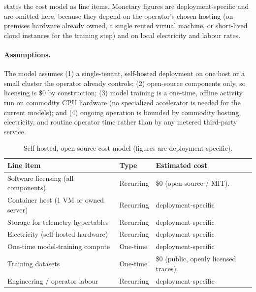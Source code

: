  states the cost model as line items. Monetary figures are
deployment-specific and are omitted here, because they depend on
the operator's chosen hosting (on-premises hardware already owned, a single
rented virtual machine, or short-lived cloud instances for the training step)
and on local electricity and labour rates.

\paragraph{Assumptions.}
The model assumes (1) a single-tenant, self-hosted deployment on one host or a
small cluster the operator already controls; (2) open-source components only, so
licensing is \$0 by construction; (3) model training is a one-time, offline
activity run on commodity CPU hardware (no specialized accelerator is needed for
the current models); and (4) ongoing operation is bounded by commodity hosting,
electricity, and routine operator time rather than by any metered third-party
service.

\begin{table}[htbp]
  \centering
  \caption[Self-hosted, open-source cost model]{Self-hosted, open-source cost model (figures are deployment-specific).}
  \label{bm:tab-cost}
  \small
  \begin{tabularx}{\linewidth}{@{}l l Y@{}}
    \toprule
    \textbf{Line item} & \textbf{Type} & \textbf{Estimated cost} \\
    \midrule
    Software licensing (all components) & Recurring & \$0 (open-source / MIT). \\
    Container host (1 VM or owned server) & Recurring & deployment-specific \\
    Storage for telemetry hypertables    & Recurring & deployment-specific \\
    Electricity (self-hosted hardware)   & Recurring & deployment-specific \\
    One-time model-training compute       & One-time  & deployment-specific \\
    Training datasets                     & One-time  & \$0 (public, openly licensed traces). \\
    Engineering / operator labour         & Recurring & deployment-specific \\
    \bottomrule
  \end{tabularx}
\end{table}

